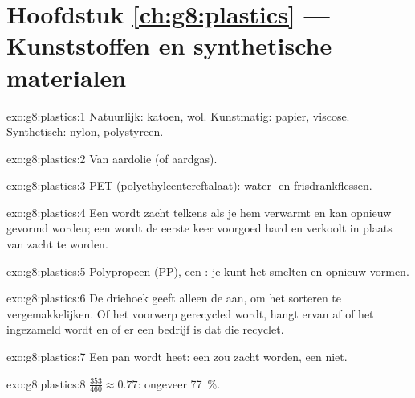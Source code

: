 \section*{Hoofdstuk \ref{ch:g8:plastics} --- Kunststoffen en synthetische materialen}

\begin{solution}{exo:g8:plastics:1}
Natuurlijk: katoen, wol. Kunstmatig: papier, viscose. Synthetisch:
nylon, polystyreen.
\end{solution}

\begin{solution}{exo:g8:plastics:2}
Van aardolie (of aardgas).
\end{solution}

\begin{solution}{exo:g8:plastics:3}
PET (polyethyleentereftalaat): water- en frisdrankflessen.
\end{solution}

\begin{solution}{exo:g8:plastics:4}
Een  wordt zacht telkens als je hem verwarmt en kan opnieuw
gevormd worden; een  wordt de eerste keer voorgoed hard en
verkoolt in plaats van zacht te worden.
\end{solution}

\begin{solution}{exo:g8:plastics:5}
Polypropeen (PP), een : je kunt het smelten en opnieuw
vormen.
\end{solution}

\begin{solution}{exo:g8:plastics:6}
De driehoek geeft alleen de  aan, om het sorteren te
vergemakkelijken. Of het voorwerp gerecycled wordt, hangt ervan af of
het ingezameld wordt en of er een bedrijf is dat die  recyclet.
\end{solution}

\begin{solution}{exo:g8:plastics:7}
Een pan wordt heet: een  zou zacht worden, een 
niet.
\end{solution}

\begin{solution}{exo:g8:plastics:8}
$\frac{353}{460} \approx 0.77$: ongeveer \qty{77}{\percent}.
\end{solution}

